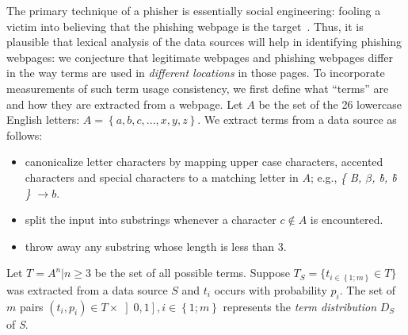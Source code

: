 \documentclass[10pt,conference,compsocconf,letterpaper]{IEEEtran}
\begin{document}
The primary technique of a phisher is essentially social engineering: fooling a victim into believing that the phishing webpage is the target~\cite{hardy:2014:targeted}. Thus, it is plausible that lexical analysis of the data sources will help in identifying phishing webpages: we conjecture that legitimate webpages and phishing webpages differ in the way terms are used in \textit{different locations} in those pages.
To incorporate measurements of such term usage consistency, we first define what ``terms'' are and how they are extracted from a webpage.
Let $A$ be the set of the 26 lowercase English letters:
$A = \left\lbrace a, b, c, ..., x, y, z \right\rbrace$. We extract terms from a data source as follows:
\begin{itemize}
 \item canonicalize letter characters by mapping upper case characters, accented characters and special characters to a matching letter in $A$; e.g., \textit{ \{ B, $\beta$, \`b, \^b \} }$\rightarrow b$.
 \item split the input into substrings whenever a character  $c \notin A$ is encountered.
 \item throw away any substring whose length is less than 3.
\end{itemize}
Let  $T = A^n \vert n \geq 3$ be the set of all possible terms. Suppose $T_S = \{t_{i \in \left\lbrace 1;m \right\rbrace} \in T\}$ was extracted from a data source $S$ and $t_i$ occurs with probability $p_i$.
The set of $m$ pairs $(t_i, p_i ) \in T \times \left] 0,1 \right], i \in \left\lbrace 1;m \right\rbrace $ represents the \emph{term distribution} $D_{S}$ of \emph{S}.
\end{document}

